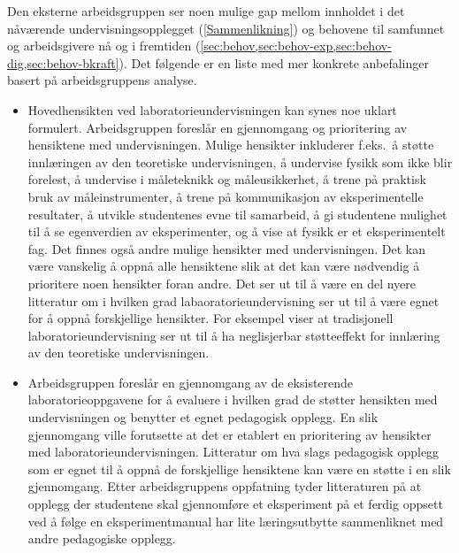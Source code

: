 \documentclass{article}
\begin{document}
Den eksterne arbeidsgruppen ser noen mulige gap mellom innholdet i det nåværende undervisningsopplegget (\cref{Sammenlikning}) og behovene til samfunnet og arbeidsgivere nå og i fremtiden (\cref{sec:behov,sec:behov-exp,sec:behov-dig,sec:behov-bkraft}). Det følgende er en liste med mer konkrete anbefalinger basert på arbeidsgruppens analyse.


\begin{itemize}
  \item Hovedhensikten ved laboratorieundervisningen kan synes noe uklart formulert. Arbeidsgruppen foreslår en gjennomgang og prioritering av hensiktene med undervisningen. Mulige hensikter inkluderer f.eks.~å støtte innlæringen av den teoretiske undervisningen, å undervise fysikk som ikke blir forelest, å undervise i måleteknikk og måleusikkerhet, å trene på praktisk bruk av måleinstrumenter, å trene på kommunikasjon av eksperimentelle resultater, å utvikle studentenes evne til samarbeid, å gi studentene mulighet til å se egenverdien av eksperimenter, og å vise at fysikk er et eksperimentelt fag. Det finnes også andre mulige hensikter med undervisningen. Det kan være vanskelig å oppnå alle hensiktene slik at det kan være nødvendig å prioritere noen hensikter foran andre. Det ser ut til å være en del nyere litteratur om i hvilken grad labaoratorieundervisning ser ut til å være egnet for å oppnå forskjellige hensikter. For eksempel viser \citet{Holmes} at tradisjonell laboratorieundervisning ser ut til å ha neglisjerbar støtteeffekt for innlæring av den teoretiske undervisningen.
   
  \item Arbeidsgruppen foreslår en gjennomgang av de eksisterende laboratorieoppgavene for å evaluere i hvilken grad de støtter hensikten med undervisningen og benytter et egnet pedagogisk opplegg. En slik gjennomgang ville forutsette at det er etablert en prioritering av hensikter med laboratorieundervisningen. Litteratur om hva slags pedagogisk opplegg som er egnet til å oppnå de forskjellige hensiktene kan være en støtte i en slik gjennomgang. Etter arbeidsgruppens oppfatning tyder litteraturen på at opplegg der studentene skal gjennomføre et eksperiment på et ferdig oppsett ved å følge en eksperimentmanual har lite læringsutbytte sammenliknet med andre pedagogiske opplegg.


\end{itemize}
\end{document}
